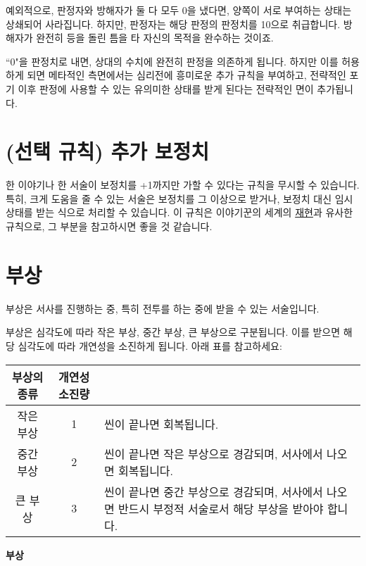 \documentclass{report}
\begin{document}
	예외적으로, 판정자와 방해자가 둘 다 모두 0을 냈다면, 양쪽이 서로 부여하는 상태는 상쇄되어 사라집니다. 하지만, 판정자는 해당 판정의 판정치를 10으로 취급합니다. 방해자가 완전히 등을 돌린 틈을 타 자신의 목적을 완수하는 것이죠.
	
	``0"을 판정치로 내면, 상대의 수치에 완전히 판정을 의존하게 됩니다. 하지만 이를 허용하게 되면 메타적인 측면에서는 심리전에 흥미로운 추가 규칙을 부여하고, 전략적인 포기 이후 판정에 사용할 수 있는 유의미한 상태를 받게 된다는 전략적인 면이 추가됩니다.
	
	\section*{(선택 규칙) 추가 보정치}
	한 이야기나 한 서술이 보정치를 +1까지만 가할 수 있다는 규칙을 무시할 수 있습니다. 특히, 크게 도움을 줄 수 있는 서술은 보정치를 그 이상으로 받거나, 보정치 대신 임시 상태를 받는 식으로 처리할 수 있습니다. 이 규칙은 이야기꾼의 세계의 \hyperlink{emersion}{재현}과 유사한 규칙으로, 그 부분을 참고하시면 좋을 것 같습니다.
	
	\section*{부상}
	부상은 서사를 진행하는 중, 특히 전투를 하는 중에 받을 수 있는 서술입니다.
	
	부상은 심각도에 따라 작은 부상, 중간 부상, 큰 부상으로 구분됩니다. 이를 받으면 해당 심각도에 따라 개연성을 소진하게 됩니다. 아래 표를 참고하세요:
	
	\begin{minipage}{\textwidth}
		\begin{tabularx}{\textwidth}{c!{\color{black}\vrule}c!{\color{black}\vrule}X}
			\hline
			\textbf{부상의 종류} & \textbf{개연성 소진량} &  \\ \hline \hline
			작은 부상 & 1 & 씬이 끝나면 회복됩니다. \\ \hline
			중간 부상 & 2 & 씬이 끝나면 작은 부상으로 경감되며, 서사에서 나오면 회복됩니다. \\ \hline
			큰 부상 & 3 & 씬이 끝나면 중간 부상으로 경감되며, 서사에서 나오면 반드시 부정적 서술로서 해당 부상을 받아야 합니다. \\ \hline
		\end{tabularx}
		
		\smallskip
		
		\begin{tightcenter}
			\textbf{부상}
		\end{tightcenter}
	\end{minipage}
	
\end{document}
